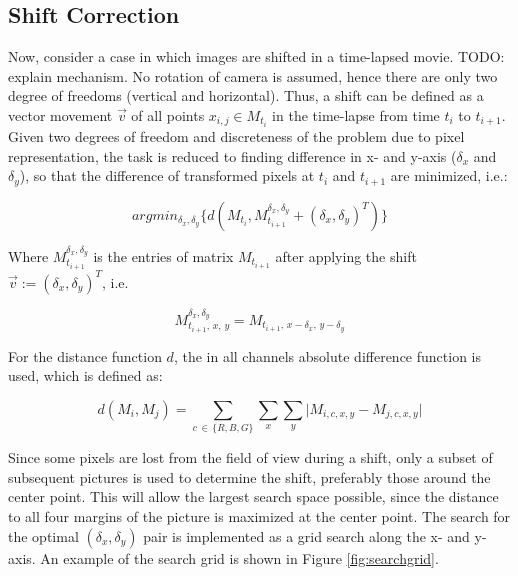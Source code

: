 \documentclass[pdftex,12pt,a4paper]{report}
\begin{document}
\subsection{Shift Correction}

Now, consider a case in which images are shifted in a time-lapsed movie. TODO: explain mechanism. No rotation of camera is assumed, hence there are only two degree of freedoms (vertical and horizontal). Thus, a shift can be defined as a vector movement $\vec{v}$ of all points $x_{i,j} \in M_{t_i}$ in the time-lapse from time $t_i$ to $t_{i+1}$. Given two degrees of freedom and discreteness of the problem due to pixel representation, the task is reduced to finding difference in x- and y-axis ($\delta_x$ and $\delta_y$), so that the difference of transformed pixels at $t_i$ and $t_{i+1}$ are minimized, i.e.:

$$
argmin_{\delta_x, \delta_y} \{d(M_{t_i}, M_{t_{i+1}}^{\delta_x, \delta_y} + (\delta_x, \delta_y)^T)\}
$$

Where $M_{t_{i+1}}^{\delta_x, \delta_y}$ is the entries of matrix $M_{t_{i+1}}$ after applying the shift $\vec{v} := (\delta_x, \delta_y)^T$, i.e.

$$M_{t_{i+1}, \, x, \, y}^{\delta_x, \delta_y} = M_{t_{i+1}, \, x - \delta_x, \, y - \delta_y}$$

For the distance function $d$, the in all channels absolute difference function is used, which is defined as:

$$
d(M_i, M_j) = \sum_{c \, \in \, \{R, B, G\}} \sum_{x} \sum_{y} \vert M_{i, c, x, y} - M_{j, c, x, y} \vert
$$


Since some pixels are lost from the field of view during a shift, only a subset of subsequent pictures is used to determine the shift, preferably those around the center point. This will allow the largest search space possible, since the distance to all four margins of the picture is maximized at the center point. The search for the optimal $(\delta_x, \delta_y)$ pair is implemented as a grid search along the x- and y-axis. An example of the search grid is shown in Figure \ref{fig:searchgrid}.\\
\end{document}
